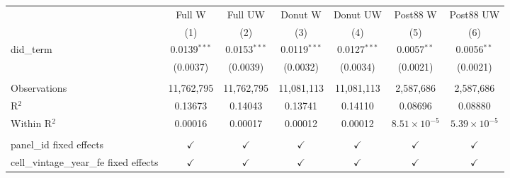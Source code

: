 
\begingroup
\centering
\begin{tabular}{lcccccc}
   \toprule
                                            & Full W         & Full UW        & Donut W        & Donut UW       & Post88 W              & Post88 UW \\   
                                            & (1)            & (2)            & (3)            & (4)            & (5)                   & (6)\\  
   \midrule 
   did\_term                                & 0.0139$^{***}$ & 0.0153$^{***}$ & 0.0119$^{***}$ & 0.0127$^{***}$ & 0.0057$^{**}$         & 0.0056$^{**}$\\   
                                            & (0.0037)       & (0.0039)       & (0.0032)       & (0.0034)       & (0.0021)              & (0.0021)\\   
    \\
   Observations                             & 11,762,795     & 11,762,795     & 11,081,113     & 11,081,113     & 2,587,686             & 2,587,686\\  
   R$^2$                                    & 0.13673        & 0.14043        & 0.13741        & 0.14110        & 0.08696               & 0.08880\\  
   Within R$^2$                             & 0.00016        & 0.00017        & 0.00012        & 0.00012        & $8.51\times 10^{-5}$  & $5.39\times 10^{-5}$\\   
    \\
   panel\_id fixed effects                  & $\checkmark$   & $\checkmark$   & $\checkmark$   & $\checkmark$   & $\checkmark$          & $\checkmark$\\   
   cell\_vintage\_year\_fe fixed effects    & $\checkmark$   & $\checkmark$   & $\checkmark$   & $\checkmark$   & $\checkmark$          & $\checkmark$\\   
   \bottomrule
\end{tabular}
\par\endgroup


